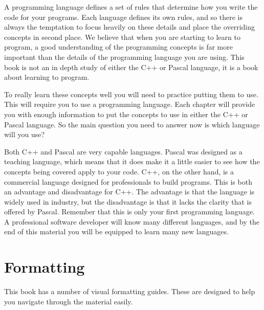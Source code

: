 A programming language defines a set of rules that determine how you write the code for your programs. Each language defines its own rules, and so there is always the temptation to focus heavily on these details and place the overriding concepts in second place. We believe that when you are starting to learn to program, a good understanding of the programming concepts is far more important than the details of the programming language you are using. This book is not an in depth study of either the C++ or Pascal language, it is a book about learning to program.

To really learn these concepts well you will need to practice putting them to use. This will require you to use a programming language. Each chapter will provide you with enough information to put the concepts to use in either the C++ or Pascal language. So the main question you need to answer now is which language will you use?

Both C++ and Pascal are very capable languages. Pascal was designed as a teaching language, which means that it does make it a little easier to see how the concepts being covered apply to your code. C++, on the other hand, is a commercial language designed for professionals to build programs. This is both an advantage and disadvantage for C++. The advantage is that the language is widely used in industry, but the disadvantage is that it lacks the clarity that is offered by Pascal. Remember that this is only your first programming language. A professional software developer will know many different languages, and by the end of this material you will be equipped to learn many new languages.




\clearpage
\section*{Formatting} %
\label{sub:formatting}

This book has a number of visual formatting guides. These are designed to help you navigate through the material easily.


